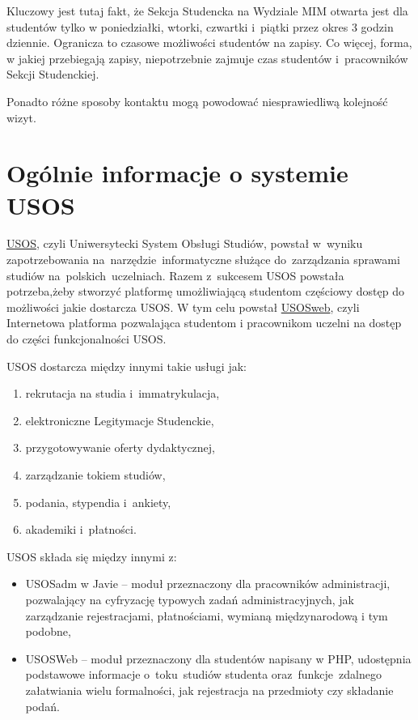 \documentclass[licencjacka]{pracamgr}
\begin{document}
Kluczowy jest tutaj fakt, że Sekcja Studencka na Wydziale MIM otwarta jest dla studentów tylko w poniedziałki, wtorki, czwartki i~piątki przez okres 3 godzin dziennie. Ogranicza to czasowe możliwości studentów na zapisy. Co więcej, forma, w jakiej przebiegają zapisy, niepotrzebnie zajmuje czas studentów i~pracowników Sekcji Studenckiej.

Ponadto różne sposoby kontaktu mogą powodować niesprawiedliwą kolejność wizyt.


\section{Ogólnie informacje o systemie USOS}
\href{http://usos.edu.pl}{USOS}, czyli Uniwersytecki System Obsługi Studiów, powstał w~wyniku zapotrzebowania na~narzędzie~informatyczne służące do~zarządzania sprawami studiów na~polskich~uczelniach. Razem z~sukcesem USOS powstała potrzeba,żeby stworzyć platformę umożliwiającą studentom częściowy dostęp do możliwości jakie dostarcza USOS. W tym celu powstał \href{htpp://usosweb.uw.edu.pl}{USOSweb}, czyli Internetowa platforma pozwalająca studentom i pracownikom uczelni na dostęp do części funkcjonalności USOS.

USOS dostarcza między innymi takie usługi jak:
\begin{enumerate}
\item rekrutacja na studia i~immatrykulacja,
\item elektroniczne Legitymacje Studenckie,
\item przygotowywanie oferty dydaktycznej,
\item zarządzanie tokiem studiów,
\item podania, stypendia i~ankiety,
\item akademiki i~płatności.
\end{enumerate}

USOS składa się między innymi z:
\begin{itemize}
\item USOSadm w Javie -- moduł przeznaczony dla pracowników administracji, pozwalający na cyfryzację typowych zadań administracyjnych, jak zarządzanie rejestracjami, płatnościami, wymianą międzynarodową i tym podobne,
\item USOSWeb -- moduł przeznaczony dla studentów napisany w PHP, udostępnia podstawowe informacje o~toku~studiów studenta oraz~funkcje~zdalnego załatwiania wielu formalności, jak rejestracja na przedmioty czy składanie podań.
\end{itemize}
\end{document}
